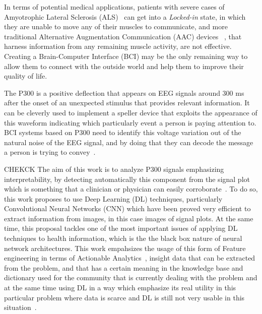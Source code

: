\documentclass[conference]{IEEEtran}
\begin{document}
In terms of potential medical applications, patients with severe cases of Amyotrophic Lateral Sclerosis (ALS)~\cite{Pugliese.etal2022} can get into a \textit{Locked-in} state, in which they are unable to move any of their muscles to communicate, and more traditional Alternative Augmentation Communication (AAC) devices ~\cite{Masiello.2022}, that harness information from any remaining muscle activity, are not effective. Creating a Brain-Computer Interface (BCI) may be the only remaining way to allow them to connect with the outside world and help them to improve their quality of life\cite{vucic.2021,GUY20185}.  


The P300 is a positive deflection that appears on EEG signals around 300 ms after the onset of an unexpected stimulus that provides relevant information. It can be cleverly used to implement a speller device that exploits the appearance of this waveform indicating which particularly event a person is paying attention to.  BCI systems based on P300 need to identify this voltage variation out of the natural noise of the EEG signal, and by doing that they can decode the message a person is trying to convey~\cite{Antonietti.etal2021,Orhanbulucu.etal2022}.

CHEKCK The aim of this work is to analyze P300 signals emphasizing interpretability, by detecting automatically this component from the signal plot which is something that a clinician or physician can easily corroborate~\cite{Papastylianou.etal2016}.  To do so, this work proposes to use Deep Learning (DL) techniques, particularly Convolutional Neural Networks (CNN) which have been proved very efficient to extract information from images, in this case images of signal plots.  At the same time, this proposal tackles one of the most important issues of applying DL techniques to health information, which is the the black box nature of neural network architectures. This work empahsizes the usage of this form of Feature engineering in terms of Actionable Analytics~\cite{Ganapathy.etal2018}, insight data that can be extracted from the problem, and that has a certain meaning in the knowledge base and dictionary used for the community that is currently dealing with the problem and at the same time using DL in a way which emphasize its real utility in this particular problem where data is scarce and DL is still not very usable in this situation~\cite{Sterniuk.etal2021}.
\end{document}
